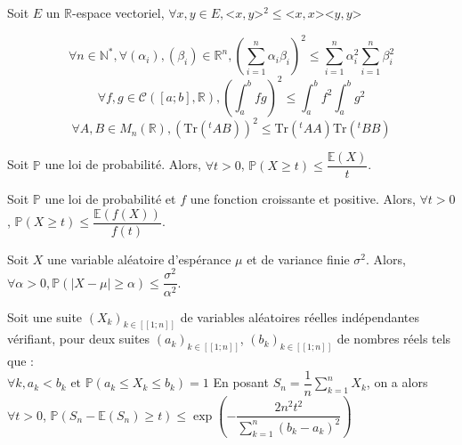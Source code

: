 \documentclass[landscape,twocolumn]{article}
\begin{document}
\begin{ine}
\begin{center}
Soit $E$ un $\mathbb{R}$-espace vectoriel, $\forall x,y \in E, $<$x,y$>$^2 \leqslant $<$x,x$>$ $<$y,y$>
\end{center}
\end{ine}

\begin{exe}
$$\forall n \in \mathbb{N}^*,\forall (\alpha_i),(\beta_i) \in \mathbb{R}^n, \left(\sum  \limits_{i=1}^n \alpha_i \beta_i \right)^2 \leqslant \sum \limits_{i=1}^n \alpha_i^2 \sum \limits_{i=1}^n \beta_i^2$$
$$\forall f,g \in \mathcal{C}([a;b],\mathbb{R}),\left( \displaystyle \int_a^b fg \right)^2 \leqslant \displaystyle \int_a^b f^2 \displaystyle \int_a^b g^2$$
$$\forall A,B \in M_n(\mathbb{R}),\left( \mbox{Tr}(^tAB) \right)^2 \leqslant \mbox{Tr}(^tAA)\mbox{Tr}(^tBB)$$
\end{exe}

\begin{ine}
\begin{center}
Soit $\mathbb{P}$ une loi de probabilité. Alors, 
$\forall t > 0$, $\mathbb{P}(X \geq t) \leq \dfrac{\mathbb{E}(X)}{t}$.
\end{center}
\end{ine}

\begin{ine}
\begin{center}
Soit $\mathbb{P}$ une loi de probabilité et $f$ une fonction croissante et positive. Alors, 
$\forall t > 0$, $\mathbb{P}(X \geq t) \leq \dfrac{\mathbb{E}(f(X))}{f(t)}$.
\end{center}
\end{ine}

\begin{ine}
\begin{center}
Soit $X$ une variable aléatoire d'espérance $\mu$ et de variance finie $\sigma^2$. Alors, 
$\forall \alpha >0, \mathbb{P}(|X-\mu| \geq \alpha) \leq \dfrac{\sigma^2}{\alpha^2}$.
\end{center}
\end{ine}

\begin{ine}
\begin{center}
Soit une suite $(X_k)_{k \in [\![1;n]\!]}$ de variables aléatoires réelles indépendantes vérifiant, pour deux suites $(a_k)_{k \in [\![1;n]\!]}$, $(b_k)_{k \in [\![1;n]\!]}$ de nombres réels tels que : \\
$\forall k, a_k < b_k \text{ et } \mathbb{P}(a_k \leq X_k \leq b_k) =1$
En posant $S_n = \dfrac{1}{n} \displaystyle \sum \limits_{k=1}^n X_k$, on a alors $\forall t > 0$, 
$\mathbb{P}(S_n - \mathbb{E}(S_n) \geq t) \leq \exp\left(-\dfrac{2n^2t^2}{\sum \limits_{k=1}^n (b_k-a_k)^2}\right)$
\end{center}
\end{ine}
\end{document}

